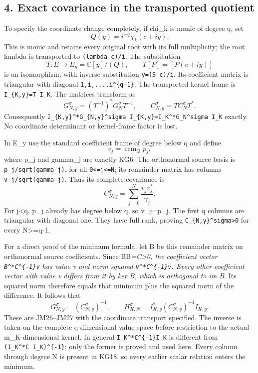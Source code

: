 \documentclass[11pt]{article}
\begin{document}
\subsection{4. Exact covariance in the transported quotient}\label{exact-covariance-in-the-transported-quotient}

To specify the coordinate change completely, if chi\_k is monic of degree q, set \[
Q(y)=i^{-q}\chi_k(c+iy).
\] This is monic and retains every original root with its full multiplicity; the root lambda is transported to \texttt{(lambda-c)/i}. The substitution \[
T:E\longrightarrow E_y=\mathbb C[y]/(Q),\qquad
T[P]=[P(c+iy)]
\tag{KG17}
\] is an isomorphism, with inverse substitution \texttt{y=(S-c)/i}. Its coefficient matrix is triangular with diagonal \texttt{1,i,...,i\^{}\{q-1\}}. The transported kernel frame is \texttt{I\_\{K,y\}=T\ I\_K}. The matrices transform as \[
G_{N,y}^\sigma=(T^{-1})^*G_N^\sigma T^{-1},\qquad
C_{N,y}^\sigma=T C_N^\sigma T^*.
\] Consequently \texttt{I\_\{K,y\}\^{}*G\_\{N,y\}\^{}sigma\ I\_\{K,y\}=I\_K\^{}*G\_N\^{}sigma\ I\_K} exactly. No coordinate determinant or kernel-frame factor is lost.

In E\_y use the standard coefficient frame of degree below q and define \[
v_j=\operatorname{rem}_Qp_j,
\] where p\_j and gamma\_j are exactly KG6. The orthonormal source basis is \texttt{p\_j/sqrt(gamma\_j)}, for all \texttt{0\textless{}=j\textless{}=N}; its remainder matrix has columns \texttt{v\_j/sqrt(gamma\_j)}. Thus its complete covariance is \[
C_{N,y}^\sigma=\sum_{j=0}^N\frac{v_jv_j^*}{\gamma_j}.
\tag{KG18}
\] For j\textless q, p\_j already has degree below q, so v\_j=p\_j. The first q columns are triangular with diagonal one. They have full rank, proving \texttt{C\_\{N,y\}\^{}sigma\textgreater{}0} for every N\textgreater=q-1.

For a direct proof of the minimum formula, let B be this remainder matrix on orthonormal source coefficients. Since BB\emph{=C\textgreater0, the coefficient vector \texttt{B\^{}*C\^{}\{-1\}v} has value v and norm squared \texttt{v\^{}*C\^{}\{-1\}v}. Every other coefficient vector with value v differs from it by ker B, which is orthogonal to im B}. Its squared norm therefore equals that minimum plus the squared norm of the difference. It follows that \[
G_{N,y}^\sigma=(C_{N,y}^\sigma)^{-1},\qquad
\boxed{H_{K,N}^\sigma=I_{K,y}^*(C_{N,y}^\sigma)^{-1}I_{K,y}.}
\tag{KG19}
\] These are JM26--JM27 with the coordinate transport specified. The inverse is taken on the complete q-dimensional value space before restriction to the actual m\_K-dimensional kernel. In general \texttt{I\_K\^{}*C\^{}\{-1\}I\_K} is different from \texttt{(I\_K\^{}*C\ I\_K)\^{}\{-1\}}; only the former is proved and used here. Every column through degree N is present in KG18, so every earlier scalar relation enters the minimum.
\end{document}
